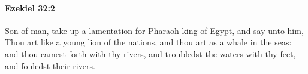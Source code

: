 
		\paragraph{Ezekiel 32:2} %
			\label{EZEKIEL-32-2}

			Son of man, take up a lamentation for Pharaoh king of Egypt, and say unto him, Thou art like a young lion of the nations, and thou art as a whale in the seas: and thou camest forth with thy rivers, and troubledst the waters with thy feet, and fouledst their rivers.


